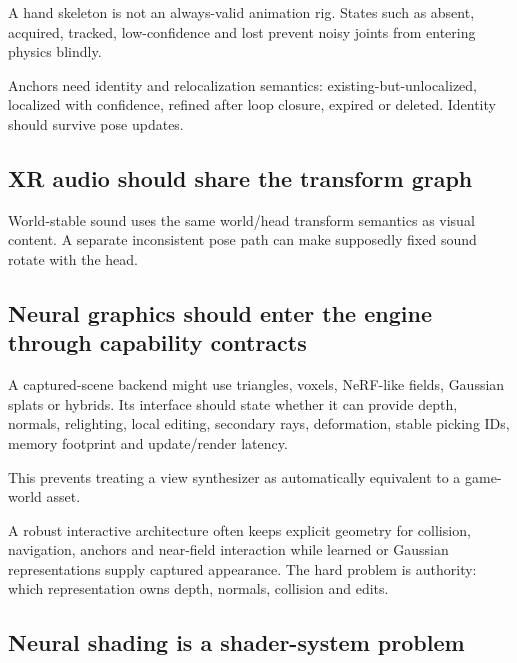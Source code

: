 \hypertarget{06-engine-ii-ch042-hands-and-anchors-need-state-machines}{}

A hand skeleton is not an always-valid animation rig. States such as absent, acquired, tracked, low-confidence and lost prevent noisy joints from entering physics blindly.

Anchors need identity and relocalization semantics: existing-but-unlocalized, localized with confidence, refined after loop closure, expired or deleted. Identity should survive pose updates.

\subsection{XR audio should share the transform graph}\label{06-engine-ii-ch042-xr-audio-should-share-the-transform-graph}

\hypertarget{06-engine-ii-ch042-xr-audio-should-share-the-transform-graph}{}

World-stable sound uses the same world/head transform semantics as visual content. A separate inconsistent pose path can make supposedly fixed sound rotate with the head.

\subsection{Neural graphics should enter the engine through capability contracts}\label{06-engine-ii-ch042-neural-graphics-should-enter-the-engine-through-capability-contracts}

\hypertarget{06-engine-ii-ch042-neural-graphics-should-enter-the-engine-through-capability-contracts}{}

A captured-scene backend might use triangles, voxels, NeRF-like fields, Gaussian splats or hybrids. Its interface should state whether it can provide depth, normals, relighting, local editing, secondary rays, deformation, stable picking IDs, memory footprint and update/render latency.

This prevents treating a view synthesizer as automatically equivalent to a game-world asset.

A robust interactive architecture often keeps explicit geometry for collision, navigation, anchors and near-field interaction while learned or Gaussian representations supply captured appearance. The hard problem is authority: which representation owns depth, normals, collision and edits.

\subsection{Neural shading is a shader-system problem}\label{06-engine-ii-ch042-neural-shading-is-a-shader-system-problem}

